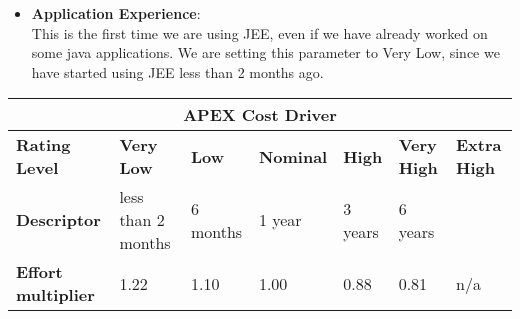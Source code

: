\begin{itemize}
\item \textbf{Application Experience}:\\
This is the first time we are using JEE, even if we have already worked on some java applications. We are setting this parameter to Very Low, since we have started using JEE less than 2 months ago.
\end{itemize}
\hspace*{-3cm}\begin{tabular}{|p{3cm}|p{2cm}|p{2cm}|p{2cm}|p{2cm}|p{2cm}|p{2cm}|}
\hline
\multicolumn{7}{|c|}{\textbf{APEX Cost Driver}}\\
\hline
\hline
\textbf{Rating Level} & \textbf{Very Low} & \textbf{Low} & \textbf{Nominal} & \textbf{High} & \textbf{Very High} & \textbf{Extra High}\\
\hline
\textbf{Descriptor} & less than 2 months & 6 months & 1 year & 3 years & 6 years & \\
\hline
\textbf{Effort multiplier} & 1.22 & 1.10 & 1.00 & 0.88 & 0.81 & n/a\\
\hline 
\end{tabular}
